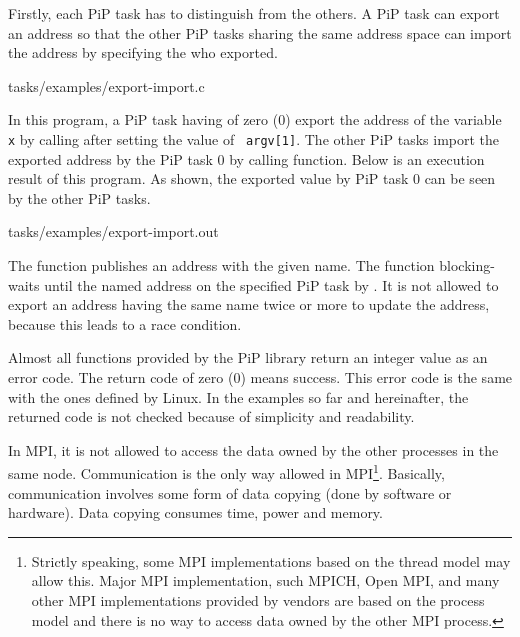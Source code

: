 Firstly, each PiP task has {\PIPID} to distinguish from the
others. A PiP task can export an address so that the other PiP tasks
sharing the same address space can import the address by
specifying the {\PIPID} who exported. 

 {tasks/examples/export-import.c}

In this program, a PiP task having {\PIPID} of zero (0) export
the address of the variable {\tt x} by calling
 after setting the value of {\tt
  argv[1]}. The 
other PiP tasks import the exported address by the PiP task 0 by
calling  function. Below is an execution
result of this program. As shown, the exported value by PiP task 0 can
be seen by the other PiP tasks. 

 {tasks/examples/export-import.out}

The  function publishes an address with
the given name. The  function
blocking-waits until the named address on the specified PiP task by
{\PIPID}. It is not allowed to export an address having the same
name twice or more to update the address, because this leads to a race
condition. 

Almost all functions provided by the PiP library return an integer
value as an error code. The return code of zero (0) means success. This
error code is the same with the ones defined by Linux. In
the examples so far and hereinafter, the returned code is not checked
because of simplicity and readability. 

In MPI, it is not allowed to access the data owned by the other
processes in the same node. Communication is the only way allowed in
MPI\footnote{Strictly speaking, some MPI implementations based on the
thread model may allow this. Major MPI implementation, such MPICH,
Open MPI, and many other MPI implementations provided by vendors are
based on the process model and there is no way to access data owned by
the other MPI process.}. Basically, communication involves some form
of data copying (done by software or hardware). Data copying consumes
time, power and memory. 

